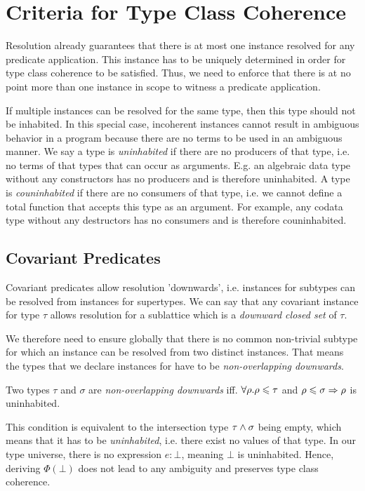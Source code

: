 \section{Criteria for Type Class Coherence}

Resolution already guarantees that there is at most one instance resolved for any predicate application.
This instance has to be uniquely determined in order for type class coherence to be satisfied.
Thus, we need to enforce that there is at no point more than one instance in scope to witness a predicate application.

If multiple instances can be resolved for the same type, then this type should not be inhabited.
In this special case, incoherent instances cannot result in ambiguous behavior in a program because there are no terms to be used in an ambiguous manner.
We say a type is \emph{uninhabited} if there are no producers of that type, i.e. no terms of that types that can occur as arguments.
E.g. an algebraic data type without any constructors has no producers and is therefore uninhabited.
A type is \emph{couninhabited} if there are no consumers of that type, i.e. we cannot define a total function that accepts this type as an argument.
For example, any codata type without any destructors has no consumers and is therefore couninhabited.

\subsection{Covariant Predicates}

Covariant predicates allow resolution 'downwards', i.e. instances for subtypes can be resolved from instances for supertypes.
We can say that any covariant instance for type $\tau$ allows resolution for a sublattice which is a \emph{downward closed set} of $\tau$.

We therefore need to ensure globally that there is no common non-trivial subtype for which an instance can be resolved from two distinct instances.
That means the types that we declare instances for have to be \emph{non-overlapping downwards}.

\begin{definition}
  Two types $\tau$ and $\sigma$ are \emph{non-overlapping downwards} iff. $\forall\rho. \rho \leqslant \tau$ and $\rho \leqslant \sigma \Rightarrow \rho$ is uninhabited.
\end{definition}

This condition is equivalent to the intersection type $\tau \wedge \sigma$ being empty, which means that it has to be \emph{uninhabited}, i.e. there exist no values of that type.
In our type universe, there is no expression $e : \bot$, meaning $\bot$ is uninhabited.
Hence, deriving $\Phi(\bot)$ does not lead to any ambiguity and preserves type class coherence.

